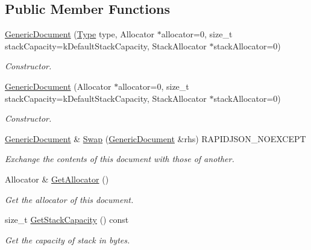 \subsection*{Public Member Functions}
\begin{DoxyCompactItemize}
\item 
\hyperlink{class_generic_document_a3da21e72ec8f26b9da77d86cc1d41cdd}{Generic\+Document} (\hyperlink{rapidjson_8h_a1d1cfd8ffb84e947f82999c682b666a7}{Type} type, Allocator $\ast$allocator=0, size\+\_\+t stack\+Capacity=k\+Default\+Stack\+Capacity, Stack\+Allocator $\ast$stack\+Allocator=0)
\begin{DoxyCompactList}\small\item\em Constructor. \end{DoxyCompactList}\item 
\hyperlink{class_generic_document_a6b1c313ad538cafc4d23d4bd5f97178c}{Generic\+Document} (Allocator $\ast$allocator=0, size\+\_\+t stack\+Capacity=k\+Default\+Stack\+Capacity, Stack\+Allocator $\ast$stack\+Allocator=0)
\begin{DoxyCompactList}\small\item\em Constructor. \end{DoxyCompactList}\item 
\hyperlink{class_generic_document}{Generic\+Document} \& \hyperlink{class_generic_document_a6290e1290fad74177625af5938c0c58f}{Swap} (\hyperlink{class_generic_document}{Generic\+Document} \&rhs) R\+A\+P\+I\+D\+J\+S\+O\+N\+\_\+\+N\+O\+E\+X\+C\+E\+PT
\begin{DoxyCompactList}\small\item\em Exchange the contents of this document with those of another. \end{DoxyCompactList}\item 
Allocator \& \hyperlink{class_generic_document_aa4609d6b19f86aec1a6b96edf2c27686}{Get\+Allocator} ()\hypertarget{class_generic_document_aa4609d6b19f86aec1a6b96edf2c27686}{}\label{class_generic_document_aa4609d6b19f86aec1a6b96edf2c27686}

\begin{DoxyCompactList}\small\item\em Get the allocator of this document. \end{DoxyCompactList}\item 
size\+\_\+t \hyperlink{class_generic_document_aa99f03016f4907332fcf70aadb645194}{Get\+Stack\+Capacity} () const \hypertarget{class_generic_document_aa99f03016f4907332fcf70aadb645194}{}\label{class_generic_document_aa99f03016f4907332fcf70aadb645194}

\begin{DoxyCompactList}\small\item\em Get the capacity of stack in bytes. \end{DoxyCompactList}\end{DoxyCompactItemize}
